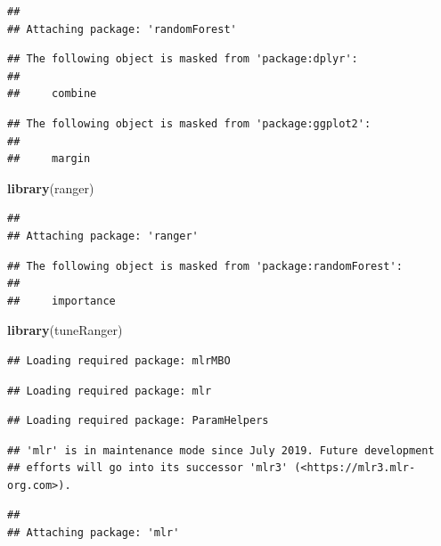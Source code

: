 \documentclass[
]{article}
\newenvironment{Shaded}{\begin{snugshade}}{\end{snugshade}}
\newcommand{\KeywordTok}[1]{\textcolor[rgb]{0.13,0.29,0.53}{\textbf{#1}}}
\newcommand{\NormalTok}[1]{#1}
\begin{document}
\begin{verbatim}
## 
## Attaching package: 'randomForest'
\end{verbatim}

\begin{verbatim}
## The following object is masked from 'package:dplyr':
## 
##     combine
\end{verbatim}

\begin{verbatim}
## The following object is masked from 'package:ggplot2':
## 
##     margin
\end{verbatim}

\begin{Shaded}
\begin{Highlighting}[]
\KeywordTok{library}\NormalTok{(ranger)}
\end{Highlighting}
\end{Shaded}

\begin{verbatim}
## 
## Attaching package: 'ranger'
\end{verbatim}

\begin{verbatim}
## The following object is masked from 'package:randomForest':
## 
##     importance
\end{verbatim}

\begin{Shaded}
\begin{Highlighting}[]
\KeywordTok{library}\NormalTok{(tuneRanger)}
\end{Highlighting}
\end{Shaded}

\begin{verbatim}
## Loading required package: mlrMBO
\end{verbatim}

\begin{verbatim}
## Loading required package: mlr
\end{verbatim}

\begin{verbatim}
## Loading required package: ParamHelpers
\end{verbatim}

\begin{verbatim}
## 'mlr' is in maintenance mode since July 2019. Future development
## efforts will go into its successor 'mlr3' (<https://mlr3.mlr-org.com>).
\end{verbatim}

\begin{verbatim}
## 
## Attaching package: 'mlr'
\end{verbatim}
\end{document}
